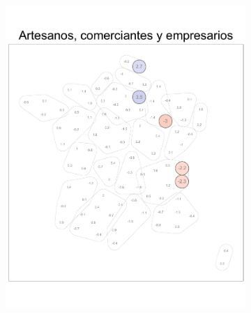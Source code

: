 \begin{figure}
\begin{subfigure}{0.235\textwidth}
	\includegraphics[width = \textwidth]{Figs/Efectos/Dorling_Efectos_CSP2_Modelo_H}
	\end{subfigure}
	~
	\begin{subfigure}{0.235\textwidth}

\end{subfigure}
\end{figure}
